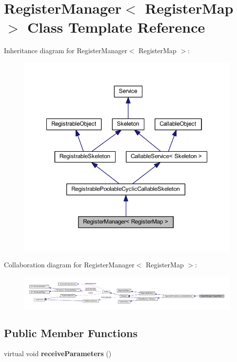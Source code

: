 \hypertarget{class_register_manager}{
\section{RegisterManager$<$ RegisterMap $>$ Class Template Reference}
\label{class_register_manager}
}


Inheritance diagram for RegisterManager$<$ RegisterMap $>$:\nopagebreak
\begin{figure}[H]
\begin{center}
\leavevmode
\includegraphics[width=355pt]{class_register_manager__inherit__graph}
\end{center}
\end{figure}


Collaboration diagram for RegisterManager$<$ RegisterMap $>$:\nopagebreak
\begin{figure}[H]
\begin{center}
\leavevmode
\includegraphics[width=400pt]{class_register_manager__coll__graph}
\end{center}
\end{figure}
\subsection*{Public Member Functions}
\begin{DoxyCompactItemize}
\item 
\hypertarget{class_register_manager_a54b8d9d461c5d9803e8de6a0a0b18c97}{
virtual void {\bfseries receiveParameters} ()}
\label{class_register_manager_a54b8d9d461c5d9803e8de6a0a0b18c97}

\end{DoxyCompactItemize}
